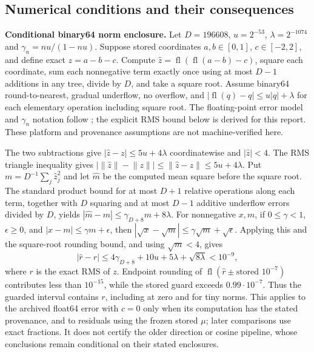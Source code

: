 \documentclass[11pt]{article}
\theoremstyle{noteplain}
\newcommand{\norm}[1]{\lVert #1\rVert}
\begin{document}
\subsection*{Numerical conditions and their consequences}
\textbf{Conditional binary64 norm enclosure.} Let $D=196608$, $u=2^{-53}$, $\lambda=2^{-1074}$ and $\gamma_n=nu/(1-nu)$. Suppose stored coordinates $a,b\in[0,1]$, $c\in[-2,2]$, and define exact $z=a-b-c$. Compute $\widehat z=\operatorname{fl}(\operatorname{fl}(a-b)-c)$, square each coordinate, sum each nonnegative term exactly once using at most $D-1$ additions in any tree, divide by $D$, and take a square root. Assume binary64 round-to-nearest, gradual underflow, no overflow, and $|\operatorname{fl}(q)-q|\le u|q|+\lambda$ for each elementary operation including square root. The floating-point error model and $\gamma_n$ notation follow \cite[Chapters 2--4]{higham2002}; the explicit RMS bound below is derived for this report. These platform and provenance assumptions are not machine-verified here.

The two subtractions give $|\widehat z-z|\le5u+4\lambda$ coordinatewise and $|\widehat z|<4$. The RMS triangle inequality gives $|\norm{\widehat z}-\norm z|\le\norm{\widehat z-z}\le5u+4\lambda$. Put $m=D^{-1}\sum_j\widehat z_j^2$ and let $\widehat m$ be the computed mean square before the square root. The standard product bound for at most $D+1$ relative operations along each term, together with $D$ squaring and at most $D-1$ additive underflow errors divided by $D$, yields $|\widehat m-m|\le\gamma_{D+8}m+8\lambda$. For nonnegative $x,m$, if $0\le\gamma<1$, $\epsilon\ge0$, and $|x-m|\le\gamma m+\epsilon$, then $|\sqrt{x}-\sqrt m|\le\gamma\sqrt m+\sqrt\epsilon$. Applying this and the square-root rounding bound, and using $\sqrt m<4$, gives
\[
 |\widehat r-r|\le4\gamma_{D+8}+10u+5\lambda+\sqrt{8\lambda}<10^{-9},
\]
where $r$ is the exact RMS of $z$. Endpoint rounding of $\operatorname{fl}(\widehat r\pm\text{stored }10^{-7})$ contributes less than $10^{-15}$, while the stored guard exceeds $0.99\cdot10^{-7}$. Thus the guarded interval contains $r$, including at zero and for tiny norms. This applies to the archived float64 error with $c=0$ only when its computation has the stated provenance, and to residuals using the frozen stored $\mu$; later comparisons use exact fractions. It does not certify the older direction or cosine pipeline, whose conclusions remain conditional on their stated enclosures.
\end{document}
